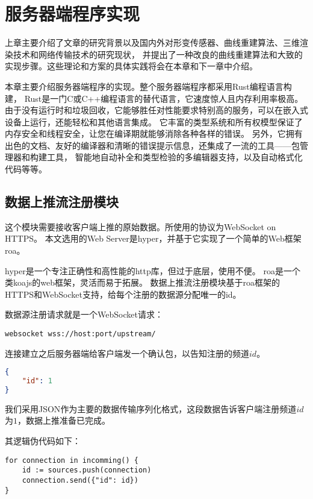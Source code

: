 \cleardoublepage

\section{服务器端程序实现}
上章主要介绍了文章的研究背景以及国内外对形变传感器、曲线重建算法、三维渲染技术和网络传输技术的研究现状，
并提出了一种改良的曲线重建算法和大致的实现步骤。这些理论和方案的具体实践将会在本章和下一章中介绍。

本章主要介绍服务器端程序的实现。整个服务器端程序都采用Rust编程语言\cite{rust}构建，
Rust是一门C或C++编程语言的替代语言，它速度惊人且内存利用率极高。
由于没有运行时和垃圾回收，它能够胜任对性能要求特别高的服务，可以在嵌入式设备上运行，还能轻松和其他语言集成。
它丰富的类型系统和所有权模型保证了内存安全和线程安全，让您在编译期就能够消除各种各样的错误。
另外，它拥有出色的文档、友好的编译器和清晰的错误提示信息，还集成了一流的工具——包管理器和构建工具，
智能地自动补全和类型检验的多编辑器支持，以及自动格式化代码等等。 

\subsection{数据上推流注册模块}
这个模块需要接收客户端上推的原始数据。所使用的协议为WebSocket on HTTPS。
本文选用的Web Server是hyper\cite{hyper}，并基于它实现了一个简单的Web框架roa\cite{roa}。

hyper是一个专注正确性和高性能的http库，但过于底层，使用不便。
roa是一个类koajs\cite{koajs}的web框架，灵活而易于拓展。
数据上推流注册模块基于roa框架的HTTPS和WebSocket支持，给每个注册的数据源分配唯一的id。

数据源注册请求就是一个WebSocket请求：

\begin{lstlisting}[label={lst:register-source},caption={发起数据源注册请求}]
websocket wss://host:port/upstream/
\end{lstlisting}

连接建立之后服务器端给客户端发一个确认包，以告知注册的频道$id$。

\begin{lstlisting}[language=json,firstnumber=1,label={lst:register-resp},caption={数据源注册成功}]
{
    "id": 1
}
\end{lstlisting}

我们采用JSON\cite{rfc7159}作为主要的数据传输序列化格式，这段数据告诉客户端注册频道$id$为$1$，数据上推准备已完成。

其逻辑伪代码如下：

\begin{lstlisting}[caption={注册数据源}]
for connection in incomming() {
    id := sources.push(connection)
    connection.send({"id": id})
}
\end{lstlisting}

